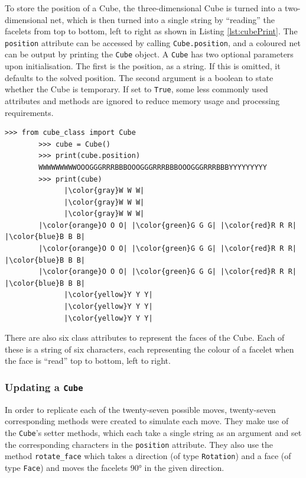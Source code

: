 \documentclass{report}
\begin{document}
    To store the position of a Cube, the three-dimensional Cube is turned into a two-dimensional net, which is then turned into a single string by \enquote{reading} the facelets from top to bottom, left to right as shown in Listing \ref{lst:cubePrint}. The \lstinline|position| attribute can be accessed by calling \lstinline|Cube.position|, and a coloured net can be output by printing the \lstinline|Cube| object. A \lstinline|Cube| has two optional parameters upon initialisation. The first is the position, as a string. If this is omitted, it defaults to the solved position. The second argument is a boolean to state whether the Cube is temporary. If set to \lstinline|True|, some less commonly used attributes and methods are ignored to reduce memory usage and processing requirements.
    
	\begin{lstlisting}[caption={The two different ways of accessing a Cube's position}, label={lst:cubePrint}]
		>>> from cube_class import Cube
		>>> cube = Cube()
		>>> print(cube.position)
		WWWWWWWWWOOOGGGRRRBBBOOOGGGRRRBBBOOOGGGRRRBBBYYYYYYYYY
		>>> print(cube)
	 	      |\color{gray}W W W|
	 	      |\color{gray}W W W|
	 	      |\color{gray}W W W|
        |\color{orange}O O O| |\color{green}G G G| |\color{red}R R R| |\color{blue}B B B|
        |\color{orange}O O O| |\color{green}G G G| |\color{red}R R R| |\color{blue}B B B|
        |\color{orange}O O O| |\color{green}G G G| |\color{red}R R R| |\color{blue}B B B|
	 	      |\color{yellow}Y Y Y|
	 	      |\color{yellow}Y Y Y|
	 	      |\color{yellow}Y Y Y|\end{lstlisting}
    
    There are also six class attributes to represent the faces of the Cube. Each of these is a string of six characters, each representing the colour of a facelet when the face is \enquote{read} top to bottom, left to right.
    
    \subsubsection{Updating a \lstinline|Cube|}
    
    In order to replicate each of the twenty-seven possible moves, twenty-seven corresponding methods were created to simulate each move. They make use of the \lstinline|Cube|'s setter methods, which each take a single string as an argument and set the corresponding characters in the \lstinline|position| attribute. They also use the method \lstinline|rotate_face| which takes a direction (of type \lstinline|Rotation|) and a face (of type \lstinline|Face|) and moves the facelets \ang{90} in the given direction.
    
\end{document}
